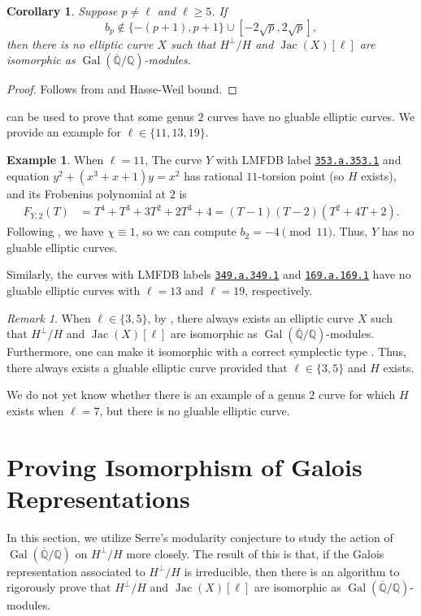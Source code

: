 \documentclass{amsproc}
\numberwithin{equation}{section}
\newtheorem{corollary}[equation]{Corollary}
\theoremstyle{definition}
\newtheorem{example}[equation]{Example}
\theoremstyle{remark}
\newtheorem{remark}[equation]{Remark}
\DeclareMathOperator{\Jac}{Jac}
\DeclareMathOperator{\Gal}{Gal}
\newcommand{\QQ}{\mathbb Q}
\newcommand{\Qbar}{\overline{\QQ}}
\newcommand{\GalQ}{\Gal(\Qbar/\QQ)}
\begin{document}
\begin{corollary}
    \label{cor:hasse_weil_bound}
    Suppose $p\neq \ell$ and $\ell\geq 5$. If
    \begin{equation}b_p \notin \{-(p+1), p+1\} \cup [-2\sqrt p, 2\sqrt p],
    \end{equation}
    then there is no elliptic curve $X$ such that $H^\perp/H$ and $\Jac(X)[\ell]$ are isomorphic as $\GalQ$-modules.
\end{corollary}
\begin{proof}
    Follows from  and Hasse-Weil bound.
\end{proof}
 can be used to prove that some genus $2$ curves have no gluable elliptic curves. We provide an example for $\ell\in\{11,13,19\}$.
\begin{example}
    When $\ell=11$,
    The curve $Y$ with LMFDB label  \href{https://www.lmfdb.org/Genus2Curve/Q/353/a/353/1}{\texttt{353.a.353.1}} and equation $y^2 + (x^3 + x + 1)y = x^2$ has rational $11$-torsion point (so $H$ exists), and its Frobenius polynomial at $2$ is
    \begin{align*}F_{Y,2}(T) 
    &= T^4+T^3+3T^2+2T^3+4 = (T-1)(T-2)(T^2+4T+2).
    \end{align*}
    Following , we have $\chi\equiv 1$, so we can compute $b_2 = -4\pmod{11}$.
    Thus, $Y$ has no gluable elliptic curves.

    Similarly, the curves with LMFDB labels \href{https://www.lmfdb.org/Genus2Curve/Q/349/a/349/1}{\texttt{349.a.349.1}} and \href{https://www.lmfdb.org/Genus2Curve/Q/169/a/169/1}{\texttt{169.a.169.1}} have no gluable elliptic curves with $\ell=13$ and $\ell=19$, respectively.
\end{example}
\begin{remark}
When $\ell\in\{3,5\}$, by \cite[Thm.~3]{modularity_mod_5},
there always exists an elliptic curve $X$ such that
$H^\perp/H$ and $\Jac(X)[\ell]$ are isomorphic as $\GalQ$-modules.
Furthermore, one can make it isomorphic with a correct symplectic type \cite[\S 13]{ec_hessian}.
Thus, there always exists a gluable elliptic curve provided that $\ell\in\{3,5\}$ and $H$ exists.

We do not yet know whether there is an example of a genus $2$ curve for which $H$ exists when $\ell=7$, but there is no gluable elliptic curve.
\end{remark}

\section{Proving Isomorphism of Galois Representations}
\label{sec:proving_isomorphism}
In this section, we utilize Serre's modularity conjecture to study the action of $\GalQ$ on $H^\perp/H$ more closely. The result of this is that, if the Galois representation associated to $H^\perp/H$ is irreducible, then there is an algorithm to rigorously prove that $H^\perp/H$ and $\Jac(X)[\ell]$ are isomorphic as $\GalQ$-modules.
\end{document}
